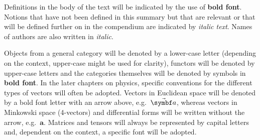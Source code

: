 \documentclass[12pt, a4paper]{report}
\begin{document}
   Definitions in the body of the text will be indicated by the use of \textbf{bold font}. Notions that have not been defined in this summary but that are relevant or that will be defined further on in the compendium are indicated by \textit{italic text}. Names of authors are also written in \textit{italic}.

   Objects from a general category will be denoted by a lower-case letter (depending on the context, upper-case might be used for clarity), functors will be denoted by upper-case letters and the categories themselves will be denoted by symbols in \textbf{bold font}. In the later chapters on physics, specific conventions for the different types of vectors will often be adopted. Vectors in Euclidean space will be denoted by a bold font letter with an arrow above, e.g.~$\vector{a}$, whereas vectors in Minkowski space (4-vectors) and differential forms will be written without the arrow, e.g.~$\symbf{a}$. Matrices and tensors will always be represented by capital letters and, dependent on the context, a specific font will be adopted.

% 
% 
% 
% 
% 


% 
% 
% 
% 
% 
% 
% 


% 

% 
% 
% 

% 
% 
% 
% 
% 
% 
% 
\end{document}
